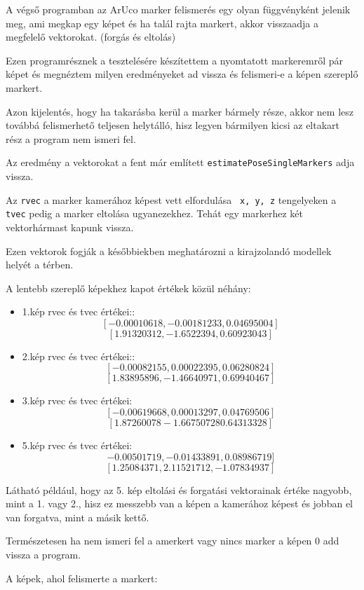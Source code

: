 
A végső programban az ArUco marker felismerés egy olyan függvényként jelenik meg, ami megkap egy képet és ha talál rajta markert, akkor visszaadja a megfelelő vektorokat. (forgás és eltolás)

Ezen programrésznek a tesztelésére készítettem a nyomtatott markeremről pár képet és megnéztem milyen eredményeket ad vissza és felismeri-e a képen szereplő markert.

Azon kijelentés, hogy ha takarásba kerül a marker bármely része, akkor nem lesz továbbá felismerhető teljesen helytálló, hisz legyen bármilyen kicsi az eltakart rész a program nem ismeri fel. 

Az eredmény a vektorokat a fent már említett \texttt{estimatePoseSingleMarkers} adja vissza. 

Az \texttt{rvec} a marker kamerához képest vett elfordulása \texttt{ x, y, z} tengelyeken a \texttt{tvec} pedig a marker eltolása ugyanezekhez. Tehát egy markerhez két vektorhármast kapunk vissza.   

Ezen vektorok fogják a későbbiekben meghatározni a kirajzolandó modellek helyét a térben.

A lentebb szereplő képekhez kapot értékek közül néhány:
\begin{itemize}
\item 1.kép rvec és tvec értékei::
\[[-0.00010618, -0.00181233, 0.04695004]\]
\[[ 1.91320312, -1.6522394,  0.60923043]\]
\item 2.kép rvec és tvec értékei::
\[[-0.00082155,  0.00022395,  0.06280824]\]
\[[ 1.83895896, -1.46640971,  0.69940467]\]
\item 3.kép rvec és tvec értékei:
\[[-0.00619668, 0.00013297,  0.04769506]\]
\[[ 1.87260078 -1.66750728  0.64313328]\]
\item 5.kép rvec és tvec értékei:
\[-0.00501719, -0.01433891,  0.08986719]\]
\[[ 1.25084371,  2.11521712, -1.07834937]\]

\end{itemize}

Látható például, hogy az 5. kép eltolási és forgatási vektorainak értéke nagyobb, mint a 1. vagy 2., hisz ez messzebb van a képen a kamerához képest és jobban el van forgatva, mint a másik kettő.


Természetesen ha nem ismeri fel a amerkert vagy nincs marker a képen 0 add vissza a program.

A képek, ahol felismerte a markert:

